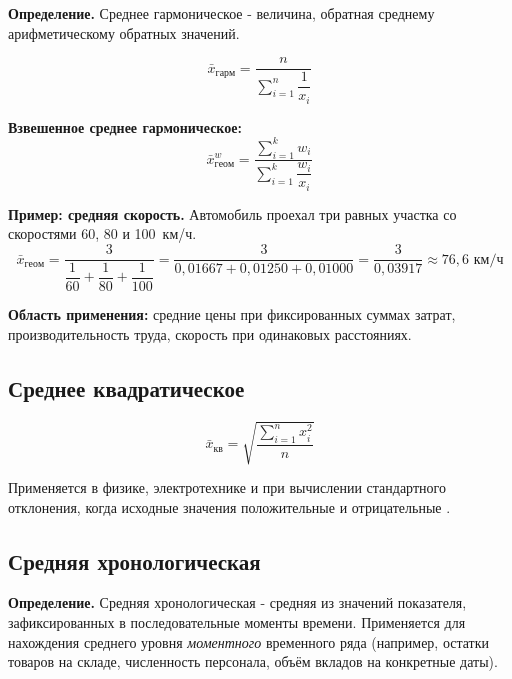 \documentclass[a4paper]{article}
\begin{document}
	\textbf{Определение.} Среднее гармоническое - величина, обратная среднему
	арифметическому обратных значений.


\begin{equation}
	\bar{x}_{гарм} = \frac{n}{\displaystyle\sum_{i=1}^{n} \dfrac{1}{x_i}}
\end{equation}

\noindent\textbf{Взвешенное среднее гармоническое:}
\begin{equation}
	\bar{x}_{геом}^w = \frac{\displaystyle\sum_{i=1}^{k} w_i}{\displaystyle\sum_{i=1}^{k} \dfrac{w_i}{x_i}}
\end{equation}


	\textbf{Пример: средняя скорость.}
	Автомобиль проехал три равных участка со скоростями 60, 80 и 100~км/ч.
	\[
	\bar{x}_{геом} = \frac{3}{\dfrac{1}{60}+\dfrac{1}{80}+\dfrac{1}{100}}
	= \frac{3}{0{,}01667+0{,}01250+0{,}01000}
	= \frac{3}{0{,}03917} \approx 76{,}6 \text{ км/ч}
	\]



	\textbf{Область применения:} средние цены при фиксированных суммах затрат,
	производительность труда, скорость при одинаковых расстояниях.


\subsection{Среднее квадратическое}

\begin{equation}
	\bar{x}_{\text{кв}} = \sqrt{\frac{\displaystyle\sum_{i=1}^{n} x_i^2}{n}}
\end{equation}

Применяется в физике, электротехнике и при вычислении стандартного отклонения, когда исходные значения положительные и отрицательные .

\subsection{Средняя хронологическая}


	\textbf{Определение.} Средняя хронологическая - средняя из значений показателя,
	зафиксированных в последовательные моменты времени. Применяется для нахождения
	среднего уровня \emph{моментного} временного ряда (например, остатки товаров
	на складе, численность персонала, объём вкладов на конкретные даты).
\end{document}
